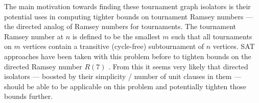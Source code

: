 \documentclass[a4paper,UKenglish,cleveref, autoref, thm-restate]{lipics-v2021}
\begin{document}
The main motivation towards finding these tournament graph isolators is their potential uses in computing tighter bounds on tournament Ramsey numbers --- the directed analog of Ramsey numbers for tournaments.  The tournament Ramsey number at $n$ is defined to be the smallest $m$ such that all tournaments on $m$ vertices contain a transitive (cycle-free) subtournament of $n$ vertices.  SAT approaches have been taken with this problem before to tighten bounds on the directed Ramsey number $R(7)$ \cite{directedramsey}.  From this it seems very likely that directed isolators --- boosted by their simplicity / number of unit clauses in them --- should be able to be applicable on this problem and potentially tighten those bounds further.






\end{document}
